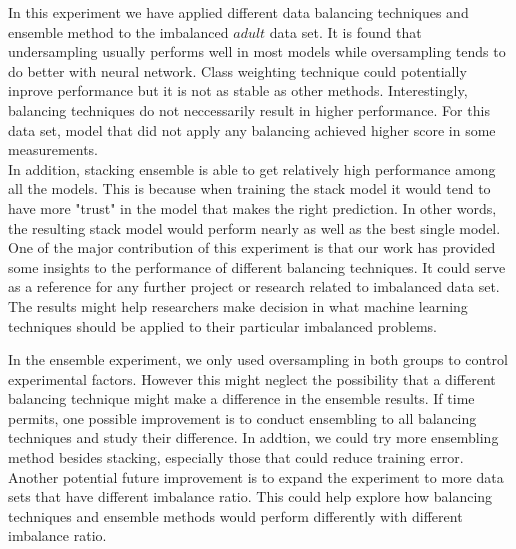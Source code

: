 \documentclass{article}
\begin{document}
In this experiment we have applied different data balancing techniques and ensemble method to the imbalanced $adult$ data set. It is found that undersampling usually performs well in most models while oversampling tends to do better with neural network. Class weighting technique could potentially inprove performance but it is not as stable as other methods. Interestingly, balancing techniques do not neccessarily result in higher performance. For this data set, model that did not apply any balancing achieved higher score in some measurements.\\

In addition, stacking ensemble is able to get relatively high performance among all the models. This is because when training the stack model it would tend to have more "trust" in the model that makes the right prediction. In other words, the resulting stack model would perform nearly as well as the best single model.\\

One of the major contribution of this experiment is that our work has provided some insights to the performance of different balancing techniques. It could serve as a reference for any further project or research related to imbalanced data set. The results might help researchers make decision in what machine learning techniques should be applied to their particular imbalanced problems.

In the ensemble experiment, we only used oversampling in both groups to control experimental factors. However this might neglect the possibility that a different balancing technique might make a difference in the ensemble results. If time permits, one possible improvement is to conduct ensembling to all balancing techniques and study their difference. In addtion, we could try more ensembling method besides stacking, especially those that could reduce training error.\\

Another potential future improvement is to expand the experiment to more data sets that have different imbalance ratio. This could help explore how balancing techniques and ensemble methods would perform differently with different imbalance ratio.\\

\medskip


\end{document}
